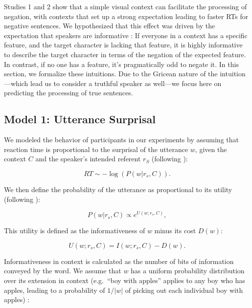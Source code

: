 \documentclass[man]{apa2}
\begin{document}
Studies 1 and 2 show that a simple visual context can facilitate the processing of negation, with contexts that set up a strong expectation leading to faster RTs for negative sentences.  We hypothesized that this effect was driven by the expectation that speakers are informative \cite{grice1975,frank2012}: If everyone in a context has a specific feature, and the target character is lacking that feature, it is highly informative to describe the target character in terms of the negation of the expected feature. In contrast, if no one has a feature, it's pragmatically odd to negate it. In this section, we formalize these intuitions. Due to the Gricean nature of the intuition---which lead us to consider a truthful speaker as well---we focus here on predicting the processing of true sentences.   

\subsection{Model 1: Utterance Surprisal}

We modeled the behavior of participants in our experiments by assuming that reaction time is proportional to the surprisal of the utterance $w$, given the context $C$ and the speaker's intended referent $r_S$ (following ):

\begin{equation}\label{eq:surprise}
RT \sim -\log(P(w| r_s, C)).
\end{equation}

\noindent We then define the probability of the utterance as proportional to its utility (following ):

\begin{equation}\label{eq:pw1}
P(w | r_s, C) \propto  e^{U(w;r_s,C)},
\end{equation} 

\noindent This utility is defined as the informativeness of $w$ minus its cost $D(w)$:

\begin{equation}\label{eq:utility}
U(w;r_s,C) = I(w;r_s, C) - D(w).
\end{equation}

\noindent Informativeness in context is calculated as the number of bits of information conveyed by the word. We assume that $w$ has a uniform probability distribution over its extension in context (e.g.\ ``boy with apples'' applies to any boy who has apples, leading to a probability of $1/|w|$ of picking out each individual boy with apples) :
\end{document}

